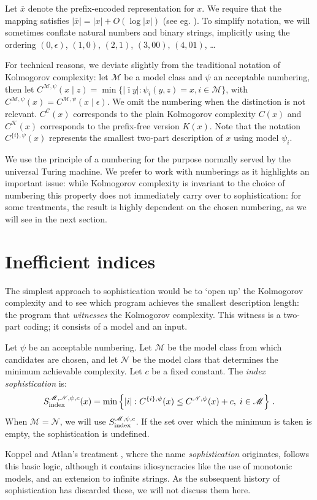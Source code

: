 \documentclass{style/llncs}
\newcommand{\M}{\mathscr M}
\newcommand{\C}{\mathscr C}
\newcommand{\K}{\mathscr K}
\newcommand{\Nm}{\mathscr N}
\newcommand{\tn}[1]{\textnormal{#1}}
\newcommand{\br}[1]{\overline{#1}}
\newcommand{\s}{S}
\newcommand{\p}{\,\text{.}}
\begin{document}
Let $\br{x}$ denote the prefix-encoded representation for $x$. We require that the mapping satisfies $|\br{x}| = |x|+O(\log|x|)$ (see eg. \cite[Section~1.4]{li1993introduction}). To simplify notation, we will sometimes conflate natural numbers and binary strings, implicitly using the ordering $(0, \epsilon)$, $(1, 0)$, $(2, 1)$, $(3, 00)$, $(4, 01)$, \ldots  

For technical reasons, we deviate slightly from the traditional notation of Kolmogorov complexity: let $\M$ be a model class and $\psi$ an acceptable numbering, then let $C^{\M,\psi}(x\mid z)=\min\{|\bar\imath y|:\psi_i(y, z)=x,i\in\M\}$, with $C^{\M,\psi}(x) = C^{\M,\psi}(x\mid \epsilon)$. We omit the numbering when the distinction is not relevant. $C^\C(x)$ corresponds to the plain Kolmogorov complexity $C(x)$ and $C^\K(x)$ corresponds to the prefix-free version $K(x)$. Note that the notation $C^{\{i\}, \psi}(x)$ represents the smallest two-part description of $x$ using model $\psi_i$.

We use the principle of a numbering for the purpose normally served by the universal Turing machine. We prefer to work with numberings as it highlights an important issue: while Kolmogorov complexity is invariant to the choice of numbering this property does not immediately carry over to sophistication: for some treatments, the result is highly dependent on the chosen numbering, as we will see in the next section. 
 
\section{Inefficient indices}
\label{section:indices}

The simplest approach to sophistication would be to `open up' the Kolmogorov complexity and to see which program achieves the smallest description length: the program that \emph{witnesses} the Kolmogorov complexity. This witness is a two-part coding; it consists of a model and an input.

\begin{definition}
Let $\psi$ be an acceptable numbering. Let $\M$ be the model class from which candidates are chosen, and let $\Nm$ be the model class that determines the minimum achievable complexity. Let $c$ be a fixed constant. The \emph{index sophistication} is:
\[
\s_{\tn{index}}^{\M,\Nm,\psi,c}(x) = \min\left\{ |i| : C^{\{i\}, \psi}(x) \leq C^{\Nm, \psi}(x)+c,\;i \in \M\right\} \p
\]
When $\M = \Nm$, we will use $\s_\tn{index}^{\M,\psi,c}$. If the set over which the minimum is taken is empty, the sophistication is undefined.\label{definition:index}
\end{definition}
Koppel and Atlan's treatment \cite{koppelSoph1988,koppel1991almost}, where the name \emph{sophistication} originates, follows this basic logic, although it contains idiosyncracies like the use of monotonic models, and an extension to infinite strings. As the subsequent history of sophistication has discarded these, we will not discuss them here.
\end{document}
